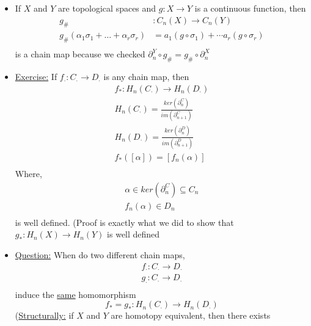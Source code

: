\documentclass[../notes.tex]{subfiles}
\begin{document}
\begin{itemize}
    \item If $X$ and $Y$ are topological spaces and $g:X\rightarrow Y$ is a continuous
        function, then
        \begin{align*}
            g_{\#}&:C_n(X)\rightarrow C_n(Y)\\
            g_{\#}(\alpha_1\sigma_1+\dots+\alpha_r\sigma_r)&=
            a_1(g\circ\sigma_1)+\cdots a_r(g\circ\sigma_r)\\
        \end{align*}
        is a chain map because we checked $\partial_n^Y\circ g_{\#}=g_{\#}\circ\partial_n^X$
    \item \underline{Exercise:} If $f_{\cdot}:C_{\cdot}\rightarrow D_{\cdot}$ is any
        chain map, then
        \begin{align*}
            f_*:H_n(C_{\cdot})\rightarrow H_n(D_{\cdot})\\
            H_n(C_{\cdot})=\frac{ker(\partial_n^C)}{im(\partial_{n+1}^C)}\\
            H_n(D_{\cdot})=\frac{ker(\partial_n^D)}{im(\partial_{n+1}^D)}\\
            f_{*}([\alpha])=[f_n(\alpha)]\\
        \end{align*}
        Where,
        \begin{align*}
            \alpha \in ker(\partial_n^C)\subseteq C_n\\
            f_n(\alpha)\in D_n\\
        \end{align*}
        is well defined. (Proof is exactly what we did to show that 
        $g_{*}:H_n(X)\rightarrow H_n(Y)$ is well defined
    \item \underline{Question:} When do two different chain maps,
        \begin{align*}
            f_{\cdot}:C_{\cdot}\rightarrow D_{\cdot}\\
            g_{\cdot}:C_{\cdot}\rightarrow D_{\cdot}\\
        \end{align*}
        induce the \underline{same} homomorphism
        \[
            f_{*}=g_{*}:H_n(C_{\cdot})\rightarrow H_n(D_{\cdot})
        \]
        (\underline{Structurally:} if $X$ and $Y$ are homotopy equivalent, then there
        exists
        \begin{center}
\end{center}
\end{itemize}
\end{document}
